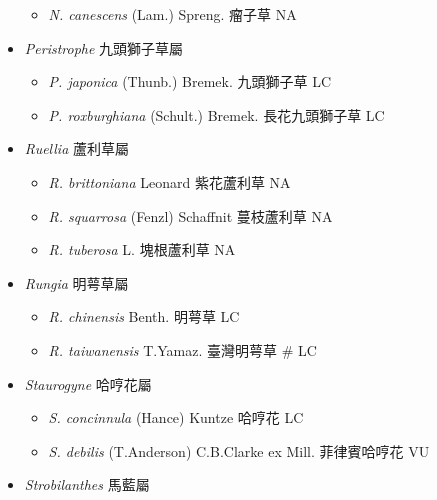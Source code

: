 \begin{itemize}
  \begin{itemize}
        \item[] \textit{N. canescens} (Lam.) Spreng.  瘤子草   NA
  \end{itemize}
 \item[] \textit{Peristrophe} 九頭獅子草屬
                                
  \begin{itemize}
        \item[] \textit{P. japonica} (Thunb.) Bremek.  九頭獅子草   LC
        \item[] \textit{P. roxburghiana} (Schult.) Bremek.  長花九頭獅子草   LC
  \end{itemize}
 \item[] \textit{Ruellia} 蘆利草屬
                                
  \begin{itemize}
        \item[] \textit{R. brittoniana} Leonard  紫花蘆利草   NA
        \item[] \textit{R. squarrosa} (Fenzl) Schaffnit  蔓枝蘆利草   NA
        \item[] \textit{R. tuberosa} L.  塊根蘆利草   NA
  \end{itemize}
 \item[] \textit{Rungia} 明萼草屬
                                
  \begin{itemize}
        \item[] \textit{R. chinensis} Benth.  明萼草   LC
        \item[] \textit{R. taiwanensis} T.Yamaz.  臺灣明萼草  \# LC
  \end{itemize}
 \item[] \textit{Staurogyne} 哈哼花屬
                                
  \begin{itemize}
        \item[] \textit{S. concinnula} (Hance) Kuntze  哈哼花   LC
        \item[] \textit{S. debilis} (T.Anderson) C.B.Clarke ex Mill.  菲律賓哈哼花   VU
  \end{itemize}
 \item[] \textit{Strobilanthes} 馬藍屬
                                

\end{itemize}
